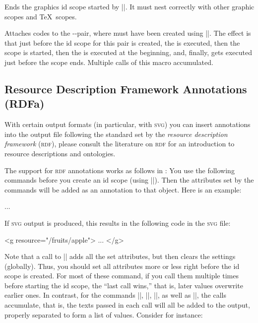 \begin{command}{\pgfsys@end@idscope}
  Ends the graphics id scope started by |\pgfsys@end@idscope|. It must
  nest correctly with other graphic scopes and \TeX\ scopes.
\end{command}


\begin{command}{\pgfsys@attach@to@id{}}
  Attaches codes to the --pair, where
   must have been created using |\pgfsys@new@id|. The effect
  is that just before the id scope for this pair is created, the
   is executed, then the scope is started, then the
   is executed at the beginning, and, finally,
   gets executed just before the scope ends. Multiple
  calls of this macro accumulated.
\end{command}



\subsection{Resource Description Framework Annotations (RDFa)}

\label{section-sys-rdf}

With certain output formats (in particular, with \textsc{svg}) you can
insert annotations into the output file following the standard set by
the \emph{resource description framework} (\textsc{rdf}), please
consult the literature on \textsc{rdf} for an introduction to resource
descriptions and ontologies.

The support for \textsc{rdf} annotations works as follows in \pgfname:
You use the following commands before you create an id scope (using
|\pgfsys@begin@idscope|). Then the attributes set by the commands will
be added as an annotation to that object. Here is an example: 

\begin{codeexample}
\pgfsys@begin@idscope
  ...
\pgfsys@end@idscope
\end{codeexample}

If \textsc{svg} output is produced, this results in the following
code in the \textsc{svg} file:
\begin{codeexample}
<g resource="/fruits/apple">
  ...
</g>  
\end{codeexample}

Note that a call to |\pgfsys@begin@idscope| adds all the set
attributes, but then clears the settings (globally). Thus, you should
set all attributes more or less right before the id scope is created.
For most of these command, if you call them multiple times before
starting the id scope, the ``last call wins,'' that is, later values
overwrite earlier ones. In contrast, for the commands
|\pgfsys@rdf@property|, |\pgfsys@rdf@rel|, |\pgfsys@rdf@rev|, as well
as |\pgfsys@rdf@typeof|, the calls accumulate, that is, the texts
passed in each call will all be added to the output, properly
separated to form a list of values. Consider for instance:


